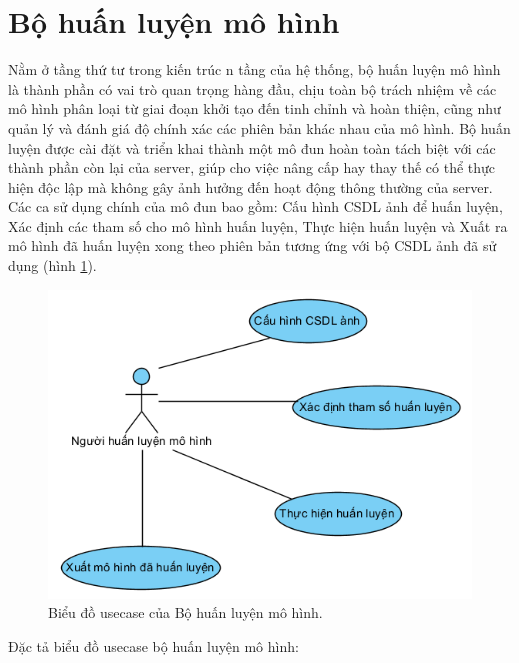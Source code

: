 \section{Bộ huấn luyện mô hình}
Nằm ở tầng thứ tư trong kiến trúc n tầng của hệ thống, bộ huấn luyện mô hình là thành phần có vai trò quan trọng hàng đầu, chịu toàn bộ trách nhiệm về các mô hình phân loại từ giai đoạn khởi tạo đến tinh chỉnh và hoàn thiện, cũng như quản lý và đánh giá độ chính xác các phiên bản khác nhau của mô hình. Bộ huấn luyện được cài đặt và triển khai thành một mô đun hoàn toàn tách biệt với các thành phần còn lại của server, giúp cho việc nâng cấp hay thay thế có thể thực hiện độc lập mà không gây ảnh hưởng đến hoạt động thông thường của server. Các ca sử dụng chính của mô đun bao gồm: Cấu hình CSDL ảnh để huấn luyện, Xác định các tham số cho mô hình huấn luyện, Thực hiện huấn luyện và Xuất ra mô hình đã huấn luyện xong theo phiên bản tương ứng với bộ CSDL ảnh đã sử dụng (hình \ref{fig:usecase_bo_huan_luyen}).
\begin{figure}[H]
	\centering
	\includegraphics[width=0.9\linewidth]{images/usecase_bo_huan_luyen}
	\caption{Biểu đồ usecase của Bộ huấn luyện mô hình.}
	\label{fig:usecase_bo_huan_luyen}
\end{figure}
Đặc tả biểu đồ usecase bộ huấn luyện mô hình:\\


